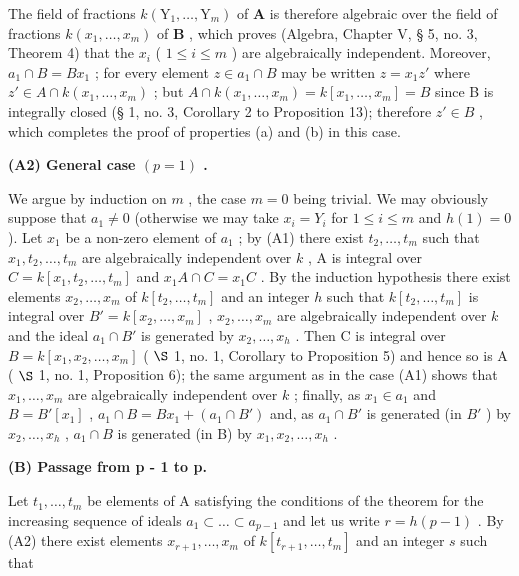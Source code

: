 The field of fractions \(k(\mathrm{Y}_1, \ldots, \mathrm{Y}_m)\) of \(\mathbf{A}\) is therefore algebraic over the field of fractions \(k(x_1, \ldots, x_m)\) of \(\mathbf{B}\) , which proves (Algebra, Chapter V, § 5, no. 3, Theorem 4) that the \(x_i\) ( \(1 \leqslant i \leqslant m\) ) are algebraically independent. Moreover, \(a_1 \cap B = Bx_1\) ; for every element \(z \in a_1 \cap B\) may be written \(z = x_1z'\) where \(z' \in A \cap k(x_1, \ldots, x_m)\) ; but \(A \cap k(x_1, \ldots, x_m) = k[x_1, \ldots, x_m] = B\) since B is integrally closed (§ 1, no. 3, Corollary 2 to Proposition 13); therefore \(z' \in B\) , which completes the proof of properties (a) and (b) in this case.

\textbf{(A2) General case \((p = 1)\) .}\par

We argue by induction on \(m\) , the case \(m = 0\) being trivial. We may obviously suppose that \(a_1 \neq 0\) (otherwise we may take \(x_i = Y_i\) for \(1 \leqslant i \leqslant m\) and \(h(1) = 0\) ). Let \(x_1\) be a non-zero element of \(a_1\) ; by (A1) there exist \(t_2, \ldots, t_m\) such that \(x_1, t_2, \ldots, t_m\) are algebraically independent over \(k\) , A is integral over \(C = k[x_1, t_2, \ldots, t_m]\) and \(x_1A \cap C = x_1C\) . By the induction hypothesis there exist elements \(x_2, \ldots, x_m\) of \(k[t_2, \ldots, t_m]\) and an integer \(h\) such that \(k[t_2, \ldots, t_m]\) is integral over \(B' = k[x_2, \ldots, x_m]\) , \(x_2, \ldots, x_m\) are algebraically independent over \(k\) and the ideal \(a_1 \cap B'\) is generated by \(x_2, \ldots, x_h\) . Then C is integral over \(B = k[x_1, x_2, \ldots, x_m]\) ( \(\S\) 1, no. 1, Corollary to Proposition 5) and hence so is A ( \(\S\) 1, no. 1, Proposition 6); the same argument as in the case (A1) shows that \(x_1, \ldots, x_m\) are algebraically independent over \(k\) ; finally, as \(x_1 \in a_1\) and \(B = B'[x_1]\) , \(a_1 \cap B = Bx_1 + (a_1 \cap B')\) and, as \(a_1 \cap B'\) is generated (in \(B'\) ) by \(x_2, \ldots, x_h\) , \(a_1 \cap B\) is generated (in B) by \(x_1, x_2, \ldots, x_h\) .

\textbf{(B) Passage from p - 1 to p.}\par

Let \(t_1, \ldots, t_m\) be elements of A satisfying the conditions of the theorem for the increasing sequence of ideals \(a_1 \subset \ldots \subset a_{p-1}\) and let us write \(r = h(p - 1)\) . By (A2) there exist elements \(x_{r+1}, \ldots, x_m\) of \(k[t_{r+1}, \ldots, t_m]\) and an integer \(s\) such that


